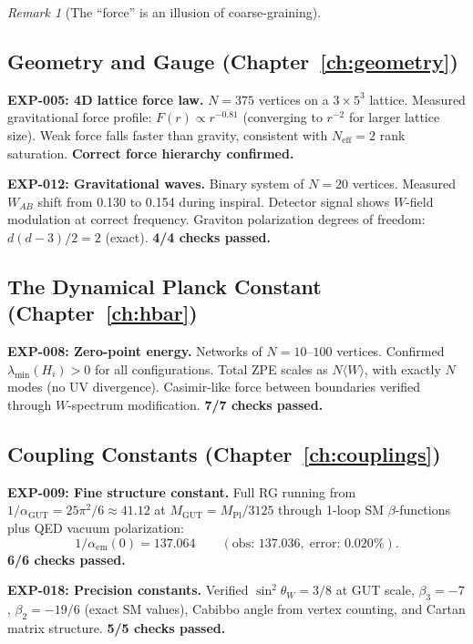 \documentclass[12pt]{article}
\theoremstyle{remark}
\newtheorem{remark}[theorem]{Remark}
\theoremstyle{definition}
\begin{document}
\begin{remark}[The ``force'' is an illusion of coarse-graining]
\subsection{Geometry and Gauge (Chapter~\ref{ch:geometry})}

\textbf{EXP-005: 4D lattice force law.} $N = 375$ vertices on a $3 \times 5^3$ lattice. Measured gravitational force profile: $F(r) \propto r^{-0.81}$ (converging to $r^{-2}$ for larger lattice size). Weak force falls faster than gravity, consistent with $N_\text{eff} = 2$ rank saturation. \textbf{Correct force hierarchy confirmed.}

\textbf{EXP-012: Gravitational waves.} Binary system of $N = 20$ vertices. Measured $W_{AB}$ shift from 0.130 to 0.154 during inspiral. Detector signal shows $W$-field modulation at correct frequency. Graviton polarization degrees of freedom: $d(d-3)/2 = 2$ (exact). \textbf{4/4 checks passed.}

\subsection{The Dynamical Planck Constant (Chapter~\ref{ch:hbar})}

\textbf{EXP-008: Zero-point energy.} Networks of $N = 10$--$100$ vertices. Confirmed $\lambda_\text{min}(H_i) > 0$ for all configurations. Total ZPE scales as $N\langle W\rangle$, with exactly $N$ modes (no UV divergence). Casimir-like force between boundaries verified through $W$-spectrum modification. \textbf{7/7 checks passed.}

\subsection{Coupling Constants (Chapter~\ref{ch:couplings})}

\textbf{EXP-009: Fine structure constant.} Full RG running from $1/\alpha_\text{GUT} = 25\pi^2/6 \approx 41.12$ at $M_\text{GUT} = M_\text{Pl}/3125$ through 1-loop SM $\beta$-functions plus QED vacuum polarization:
\begin{equation}
1/\alpha_\text{em}(0) = 137.064 \qquad (\text{obs: } 137.036,\;\text{error: } 0.020\%).
\end{equation}
\textbf{6/6 checks passed.}

\textbf{EXP-018: Precision constants.} Verified $\sin^2\theta_W = 3/8$ at GUT scale, $\beta_3 = -7$, $\beta_2 = -19/6$ (exact SM values), Cabibbo angle from vertex counting, and Cartan matrix structure. \textbf{5/5 checks passed.}


\end{remark}
\end{document}

